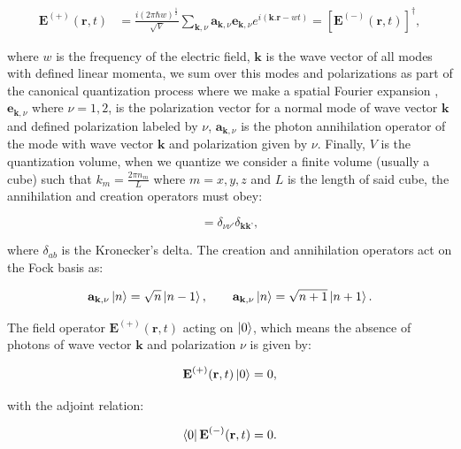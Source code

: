 \documentclass[12pt]{book}
\begin{document}
\begin{align}
\textbf{E}^{(+)} (\textbf{r},t)&=\frac{i(2 \pi \hbar w)^{\frac{1}{2}}}{\sqrt{V}} \sum_{\textbf{k},\nu}  \mathbf{a}_{\textbf{k},\nu} \mathbf{e}_{\textbf{k},\nu} e^{i(\textbf{k.r}-wt)}=[\textbf{E}^{(-)} (\textbf{r},t)]^{\dagger}, \label{quanfield}
\end{align}

where $w$ is the frequency of the electric field, $\mathbf{k}$ is the wave vector of all modes with defined linear momenta, we sum over this modes and polarizations as part of the canonical quantization process where we make a spatial Fourier expansion \cite{grynberg}, $\mathbf{e}_{\textbf{k},\nu}$ where $\nu=1,2$, is the polarization vector for a normal mode of wave vector $\mathbf{k}$ and defined polarization labeled by $\nu$, $\mathbf{a}_{\textbf{k},\nu}$ is the photon annihilation operator of the mode with wave vector $\mathbf{k}$ and polarization given by $\nu$. Finally, $V$ is the quantization volume, when we quantize we consider a finite volume (usually a cube) such that $k_{m}=\frac{2 \pi n_{m}}{L}$ where $m=x,y,z$ and $L$ is the length of said cube, the annihilation and creation operators must obey:

\begin{equation}
[\mathbf{a}_{\textbf{k},\nu},\mathbf{a^{\dagger}}_{\textbf{k},\nu}]=\delta_{\nu \nu'}\delta_{\textbf{k}\textbf{k'}},
\end{equation}

where $\delta_{ab}$ is the Kronecker's delta. The creation and annihilation operators act on the Fock basis as:

\begin{equation}
    \mathbf{a}_{\textbf{k},\nu}\ket{n}=\sqrt{n}\ket{n-1},\qquad
    \mathbf{a}_{\textbf{k},\nu}\ket{n}=\sqrt{n+1}\ket{n+1}.\label{Fock}
\end{equation}

The field operator $\textbf{E}^{(+)} (\textbf{r},t)$ acting on $\ket{0}$, which means the absence of photons of wave vector $\mathbf{k}$ and polarization $\nu$ is given by:

\begin{equation}
\textbf{E}^{(+)} (\textbf{r},t)\ket{0}=0,
\end{equation}

 with the adjoint relation:

\begin{equation}
\bra{0}\textbf{E}^{(-)} (\textbf{r},t)=0.
\end{equation}
\end{document}
